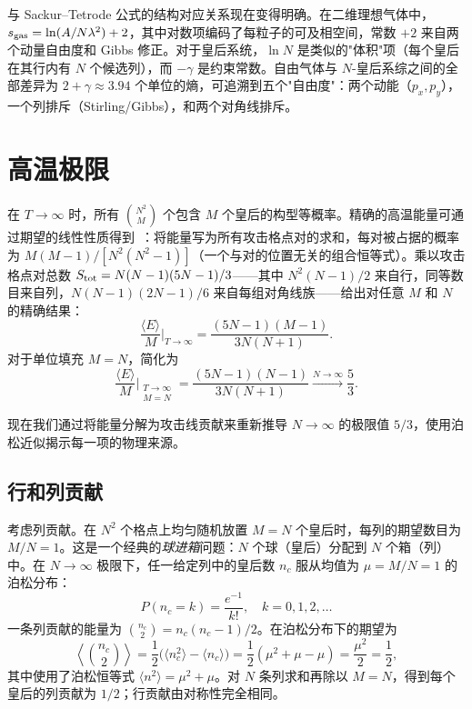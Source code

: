 \documentclass[aps, pre, reprint, amsmath, amssymb, superscriptaddress, floatfix]{revtex4-2}
\begin{document}
与 Sackur--Tetrode 公式的结构对应关系现在变得明确。在二维理想气体中，$s_{\rm gas} = \ln(A/N\lambda^2) + 2$，其中对数项编码了每粒子的可及相空间，常数 $+2$ 来自两个动量自由度和 Gibbs 修正。对于皇后系统，$\ln N$ 是类似的"体积"项（每个皇后在其行内有 $N$ 个候选列），而 $-\gamma$ 是约束常数。自由气体与 $N$-皇后系综之间的全部差异为 $2 + \gamma \approx 3.94$ 个单位的熵，可追溯到五个"自由度"：两个动能（$p_x, p_y$），一个列排斥（Stirling/Gibbs），和两个对角线排斥。


\section{高温极限}
\label{sec:highT}

在 $T \to \infty$ 时，所有 $\binom{N^2}{M}$ 个包含 $M$ 个皇后的构型等概率。精确的高温能量可通过期望的线性性质得到~\cite{Polson2024}：将能量写为所有攻击格点对的求和，每对被占据的概率为 $M(M-1)/[N^2(N^2-1)]$（一个与对的位置无关的组合恒等式）。乘以攻击格点对总数 $S_{\rm tot} = N(N-1)(5N-1)/3$——其中 $N^2(N-1)/2$ 来自行，同等数目来自列，$N(N-1)(2N-1)/6$ 来自每组对角线族——给出对任意 $M$ 和 $N$ 的精确结果：
\begin{equation}
  \frac{\langle E \rangle}{M}\bigg|_{T \to \infty}
  = \frac{(5N-1)(M-1)}{3N(N+1)}.
  \label{eq:E_highT_general}
\end{equation}
对于单位填充 $M = N$，简化为
\begin{equation}
  \frac{\langle E \rangle}{M}\bigg|_{\substack{T \to \infty \\ M = N}}
  = \frac{(5N-1)(N-1)}{3N(N+1)}
  \xrightarrow{N \to \infty} \frac{5}{3}.
  \label{eq:E_highT}
\end{equation}

现在我们通过将能量分解为攻击线贡献来重新推导 $N \to \infty$ 的极限值 $5/3$，使用泊松近似揭示每一项的物理来源。

\subsection{行和列贡献}

考虑列贡献。在 $N^2$ 个格点上均匀随机放置 $M = N$ 个皇后时，每列的期望数目为 $M/N = 1$。这是一个经典的\textit{球进箱}问题：$N$ 个球（皇后）分配到 $N$ 个箱（列）中。在 $N \to \infty$ 极限下，任一给定列中的皇后数 $n_c$ 服从均值为 $\mu = M/N = 1$ 的泊松分布：
\begin{equation}
  P(n_c = k) = \frac{e^{-1}}{k!}, \quad k = 0, 1, 2, \ldots
  \label{eq:Poisson_col}
\end{equation}
一条列贡献的能量为 $\binom{n_c}{2} = n_c(n_c - 1)/2$。在泊松分布下的期望为
\begin{equation}
  \left\langle \binom{n_c}{2} \right\rangle
  = \frac{1}{2}\bigl(\langle n_c^2 \rangle - \langle n_c \rangle\bigr)
  = \frac{1}{2}(\mu^2 + \mu - \mu) = \frac{\mu^2}{2} = \frac{1}{2},
  \label{eq:col_energy}
\end{equation}
其中使用了泊松恒等式 $\langle n^2 \rangle = \mu^2 + \mu$。对 $N$ 条列求和再除以 $M = N$，得到每个皇后的列贡献为 $1/2$；行贡献由对称性完全相同。
\end{document}
